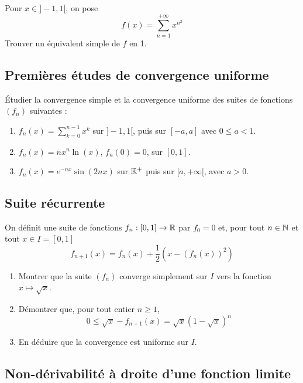 Pour $x\in ]-1,1[$, on pose
\[
    f(x) = \sum\limits_{n=1}^{+\infty} x^{n^2}
\]
Trouver un équivalent simple de $f$ en 1.

\subsection{Premières études de convergence uniforme}

Étudier la convergence simple et la convergence uniforme des suites de fonctions $(f_n)$ suivantes :
\begin{enumerate}
    \item $f_n(x)=\sum\limits_{k=0}^{n-1}x^k$ sur $]-1,1[$, puis sur $[-a,a]$ avec $0\leqslant a<1$.
    \item $f_n(x)=nx^n\ln(x)$, $f_n(0)=0$, sur $[0,1]$.
    \item $f_n(x)=e^{-nx}\sin(2nx)$ sur $\mathbb{R}^+$ puis sur $[a,+\infty[$, avec $a>0$.
\end{enumerate}

\subsection{Suite récurrente}

On définit une suite de fonctions $f_n:[0,1]\to\mathbb{R}$ par $f_0=0$ et, pour tout $n\in\mathbb{N}$ et tout $x\in I=[0,1]$
\[
    f_{n+1}(x)=f_n(x)+\frac{1}{2}\left(x-(f_n(x))^2\right)
\]
\begin{enumerate}
    \item Montrer que la suite $(f_n)$ converge simplement sur $I$ vers la 
fonction $x\mapsto \sqrt{x}$. 
    \item Démontrer que, pour tout entier $n\geq 1$,
\[
    0\leqslant \sqrt{x}-f_{n+1}(x)=\sqrt{x}\left(1-\sqrt{x}\right)^n
\]
    \item En déduire que la convergence est uniforme sur $I$.
\end{enumerate}

\subsection{Non-dérivabilité à droite d'une fonction limite}

